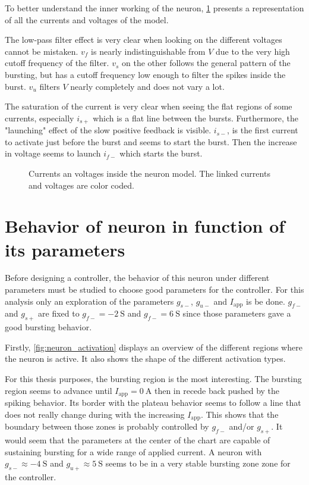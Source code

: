 To better understand the inner working of the neuron, \cref{fig:neuron_inside} presents a representation of all the currents and voltages of the model. 

The low-pass filter effect is very clear when looking on the different voltages cannot be mistaken.
$v_f$ is nearly indistinguishable from $V$ due to the very high cutoff frequency of the filter.
$v_s$ on the other follows the general pattern of the bursting, but has a cutoff frequency low enough to filter the spikes inside the burst.
$v_u$ filters $V$ nearly completely and does not vary a lot.

The saturation of the current is very clear when seeing the flat regions of some currents, especially $i_{s+}$ which is a flat line between the bursts.
Furthermore, the "launching" effect of the slow positive feedback is visible.
$i_{s-}$, is the first current to activate just before the burst and seems to start the burst. 
Then the increase in voltage seems to launch $i_{f-}$ which starts the burst.

\begin{figure}[!htb]
    \centering
    \caption{Currents an voltages inside the neuron model. The linked currents and voltages are color coded.}
    \label{fig:neuron_inside}
\end{figure}

\section{Behavior of neuron in function of its parameters}

Before designing a controller, the behavior of this neuron under different parameters must be studied to choose good parameters for the controller. 
For this analysis only an exploration of the parameters $g_{s-}$, $g_{u-}$ and $I_\text{app}$ is be done.
$g_{f-}$ and $g_{s+}$ are fixed to $g_{f-} = \qty{-2}{\siemens}$ and $g_{f-} = \qty{6}{\siemens}$ since those parameters gave a good bursting behavior.

Firstly, \cref{fig:neuron_activation} displays an overview of the different regions where the neuron is active.
It also shows the shape of the different activation types.

For this thesis purposes, the bursting region is the most interesting. 
The bursting region seems to advance until $I_\text{app}=\qty{0}{\ampere}$ then in recede back pushed by the spiking behavior.
Its border with the plateau behavior seems to follow a line that does not really change during with the increasing $I_\text{app}$. 
This shows that the boundary between those zones is probably controlled by $g_{f-}$ and/or $g_{s+}$.
It would seem that the parameters at the center of the chart are capable of sustaining bursting for a wide range of applied current. 
A neuron with $g_{s-} \approx \qty{-4}{\siemens}$ and $g_{u+} \approx \qty{5}{\siemens}$ seems to be in a very stable bursting zone zone for the controller.

